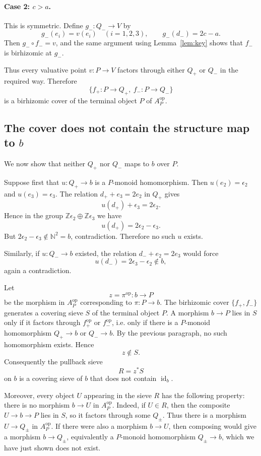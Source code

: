 \documentclass{article}
\theoremstyle{definition}
\newcommand{\id}{\operatorname{id}}
\newcommand{\bbZ}{\mathbb Z}
\newcommand{\bbN}{\mathbb N}
\begin{document}
\paragraph{Case 2: $c>a$.}
This is symmetric.  Define $g_-:Q_-\to V$ by
\[
g_-(e_i)=v(e_i)\quad(i=1,2,3),\qquad
g_-(d_-)=2c-a.
\]
Then $g_-\circ f_-=v$, and the same argument using Lemma~\ref{lem:key}
shows that $f_-$ is birhizomic at $g_-$.

Thus every valuative point $v:P\to V$ factors through either $Q_+$ or $Q_-$
in the required way.  Therefore
\[
\{f_+:P\to Q_+,\ f_-:P\to Q_-\}
\]
is a birhizomic cover of the terminal object $P$ of $A_P^{\mathrm{op}}$.

\subsection{The cover does not contain the structure map to $b$}

We now show that neither $Q_+$ nor $Q_-$ maps to $b$ over $P$.

Suppose first that $u:Q_+\to b$ is a $P$-monoid homomorphism.  Then
$u(e_2)=\epsilon_2$ and $u(e_3)=\epsilon_3$.  The relation
$d_++e_3=2e_2$ in $Q_+$ gives
\[
u(d_+)+\epsilon_3=2\epsilon_2.
\]
Hence in the group $\bbZ\epsilon_2\oplus \bbZ\epsilon_3$ we have
\[
u(d_+)=2\epsilon_2-\epsilon_3.
\]
But $2\epsilon_2-\epsilon_3\notin \bbN^2=b$, contradiction.  Therefore no such
$u$ exists.

Similarly, if $u:Q_-\to b$ existed, the relation $d_-+e_2=2e_3$ would force
\[
u(d_-)=2\epsilon_3-\epsilon_2\notin b,
\]
again a contradiction.

Let
\[
z=\pi^{\mathrm{op}}:b\longrightarrow P
\]
be the morphism in $A_P^{\mathrm{op}}$ corresponding to $\pi:P\to b$.  The
birhizomic cover $\{f_+,f_-\}$ generates a covering sieve $S$ of the terminal
object $P$.  A morphism $b\to P$ lies in $S$ only if it factors through
$f_+^{\mathrm{op}}$ or $f_-^{\mathrm{op}}$, i.e. only if there is a
$P$-monoid homomorphism $Q_+\to b$ or $Q_-\to b$.  By the previous paragraph,
no such homomorphism exists.  Hence
\[
z\notin S.
\]
Consequently the pullback sieve
\[
R=z^*S
\]
on $b$ is a covering sieve of $b$ that does not contain $\id_b$.

Moreover, every object $U$ appearing in the sieve $R$ has the following
property: there is no morphism $b\to U$ in $A_P^{\mathrm{op}}$.  Indeed, if
$U\in R$, then the composite $U\to b\to P$ lies in $S$, so it factors through
some $Q_\pm$.  Thus there is a morphism $U\to Q_\pm$ in $A_P^{\mathrm{op}}$.
If there were also a morphism $b\to U$, then composing would give a morphism
$b\to Q_\pm$, equivalently a $P$-monoid homomorphism $Q_\pm\to b$, which we
have just shown does not exist.
\end{document}
